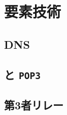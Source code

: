\chapter{要素技術}
\newcommand{\popt}{\texttt{POP3}}
\section{DNS}\label{chap:DNS}
\section{\smtp と \popt}\label{chap:smtppop}
\section{第3者リレー}